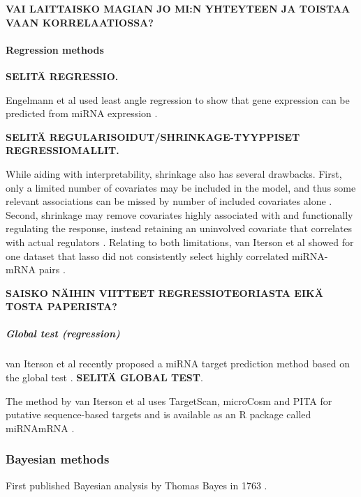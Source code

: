 \textbf{VAI LAITTAISKO MAGIAN JO MI:N YHTEYTEEN JA TOISTAA VAAN
KORRELAATIOSSA?}



\paragraph{Regression methods}\label{regression-methods}

\textbf{SELITÄ REGRESSIO.}

Engelmann et al used least angle regression to show that gene expression can
be predicted from miRNA expression \citep{Engelmann}.

\textbf{SELITÄ REGULARISOIDUT/SHRINKAGE-TYYPPISET REGRESSIOMALLIT.}

While aiding with interpretability, shrinkage also has several drawbacks.
First, only a limited number of covariates may be included in the model, and
thus some relevant associations can be missed by number of included covariates
alone \citep{vanIterson2013}. Second, shrinkage may remove covariates highly
associated with and functionally regulating the response, instead retaining an
uninvolved covariate that correlates with actual regulators \citep{Engelmann}.
Relating to both limitations, van Iterson et al showed for one dataset that
lasso did not consistently select highly correlated miRNA-mRNA pairs
\citep{vanIterson2013}.

\textbf{SAISKO NÄIHIN VIITTEET REGRESSIOTEORIASTA EIKÄ TOSTA PAPERISTA?}


\subparagraph{Global test (regression)}\label{global-test-regression}

van Iterson et al recently proposed a miRNA target prediction method based on
the global test \citep{vanIterson2013}. \textbf{SELITÄ GLOBAL TEST}.

The method by van Iterson et al uses TargetScan, microCosm and PITA for
putative sequence-based targets and is available as an R package called
miRNAmRNA \citep{vanItersonWeb}.





\subsubsection{Bayesian methods}\label{bayesian-methods}

First published Bayesian analysis by Thomas Bayes in 1763 \citep{Gelman2013}.

